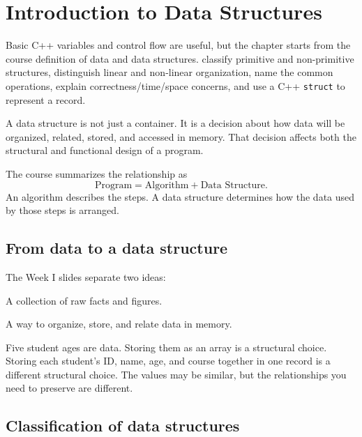 \chapter{Introduction to Data Structures}
\label{ch:introduction}

\chapterguide%
  {Basic C++ variables and control flow are useful, but the chapter starts from the course definition of data and data structures.}
  {classify primitive and non-primitive structures, distinguish linear and non-linear organization, name the common operations, explain correctness/time/space concerns, and use a C++ \texttt{struct} to represent a record.}

A data structure is not just a container. It is a decision about how data will be organized, related, stored, and accessed in memory. That decision affects both the structural and functional design of a program.

\begin{keyidea}
The course summarizes the relationship as
\[
\text{Program} = \text{Algorithm} + \text{Data Structure}.
\]
An algorithm describes the steps. A data structure determines how the data used by those steps is arranged.
\end{keyidea}

\section{From data to a data structure}

The Week I slides separate two ideas:

\begin{description}[leftmargin=1.4in,style=nextline]
  \item[Data] A collection of raw facts and figures.
  \item[Data structure] A way to organize, store, and relate data in memory.
\end{description}

\begin{intuition}
Five student ages are data. Storing them as an array is a structural choice. Storing each student's ID, name, age, and course together in one record is a different structural choice. The values may be similar, but the relationships you need to preserve are different.
\end{intuition}

\section{Classification of data structures}

